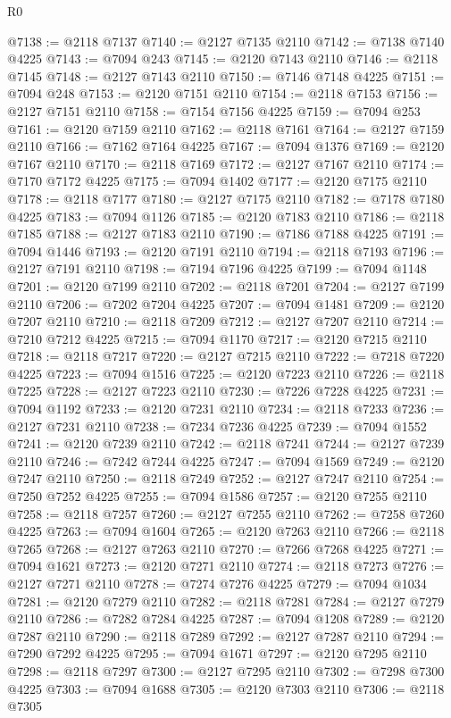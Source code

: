 \begin{lexlean}{R0}
\begin{coremodule}
@7138 := @2118 @7137
@7140 := @2127 @7135 @2110
@7142 := @7138 @7140 @4225
@7143 := @7094 @243
@7145 := @2120 @7143 @2110
@7146 := @2118 @7145
@7148 := @2127 @7143 @2110
@7150 := @7146 @7148 @4225
@7151 := @7094 @248
@7153 := @2120 @7151 @2110
@7154 := @2118 @7153
@7156 := @2127 @7151 @2110
@7158 := @7154 @7156 @4225
@7159 := @7094 @253
@7161 := @2120 @7159 @2110
@7162 := @2118 @7161
@7164 := @2127 @7159 @2110
@7166 := @7162 @7164 @4225
@7167 := @7094 @1376
@7169 := @2120 @7167 @2110
@7170 := @2118 @7169
@7172 := @2127 @7167 @2110
@7174 := @7170 @7172 @4225
@7175 := @7094 @1402
@7177 := @2120 @7175 @2110
@7178 := @2118 @7177
@7180 := @2127 @7175 @2110
@7182 := @7178 @7180 @4225
@7183 := @7094 @1126
@7185 := @2120 @7183 @2110
@7186 := @2118 @7185
@7188 := @2127 @7183 @2110
@7190 := @7186 @7188 @4225
@7191 := @7094 @1446
@7193 := @2120 @7191 @2110
@7194 := @2118 @7193
@7196 := @2127 @7191 @2110
@7198 := @7194 @7196 @4225
@7199 := @7094 @1148
@7201 := @2120 @7199 @2110
@7202 := @2118 @7201
@7204 := @2127 @7199 @2110
@7206 := @7202 @7204 @4225
@7207 := @7094 @1481
@7209 := @2120 @7207 @2110
@7210 := @2118 @7209
@7212 := @2127 @7207 @2110
@7214 := @7210 @7212 @4225
@7215 := @7094 @1170
@7217 := @2120 @7215 @2110
@7218 := @2118 @7217
@7220 := @2127 @7215 @2110
@7222 := @7218 @7220 @4225
@7223 := @7094 @1516
@7225 := @2120 @7223 @2110
@7226 := @2118 @7225
@7228 := @2127 @7223 @2110
@7230 := @7226 @7228 @4225
@7231 := @7094 @1192
@7233 := @2120 @7231 @2110
@7234 := @2118 @7233
@7236 := @2127 @7231 @2110
@7238 := @7234 @7236 @4225
@7239 := @7094 @1552
@7241 := @2120 @7239 @2110
@7242 := @2118 @7241
@7244 := @2127 @7239 @2110
@7246 := @7242 @7244 @4225
@7247 := @7094 @1569
@7249 := @2120 @7247 @2110
@7250 := @2118 @7249
@7252 := @2127 @7247 @2110
@7254 := @7250 @7252 @4225
@7255 := @7094 @1586
@7257 := @2120 @7255 @2110
@7258 := @2118 @7257
@7260 := @2127 @7255 @2110
@7262 := @7258 @7260 @4225
@7263 := @7094 @1604
@7265 := @2120 @7263 @2110
@7266 := @2118 @7265
@7268 := @2127 @7263 @2110
@7270 := @7266 @7268 @4225
@7271 := @7094 @1621
@7273 := @2120 @7271 @2110
@7274 := @2118 @7273
@7276 := @2127 @7271 @2110
@7278 := @7274 @7276 @4225
@7279 := @7094 @1034
@7281 := @2120 @7279 @2110
@7282 := @2118 @7281
@7284 := @2127 @7279 @2110
@7286 := @7282 @7284 @4225
@7287 := @7094 @1208
@7289 := @2120 @7287 @2110
@7290 := @2118 @7289
@7292 := @2127 @7287 @2110
@7294 := @7290 @7292 @4225
@7295 := @7094 @1671
@7297 := @2120 @7295 @2110
@7298 := @2118 @7297
@7300 := @2127 @7295 @2110
@7302 := @7298 @7300 @4225
@7303 := @7094 @1688
@7305 := @2120 @7303 @2110
@7306 := @2118 @7305

\end{coremodule}
\end{lexlean}
